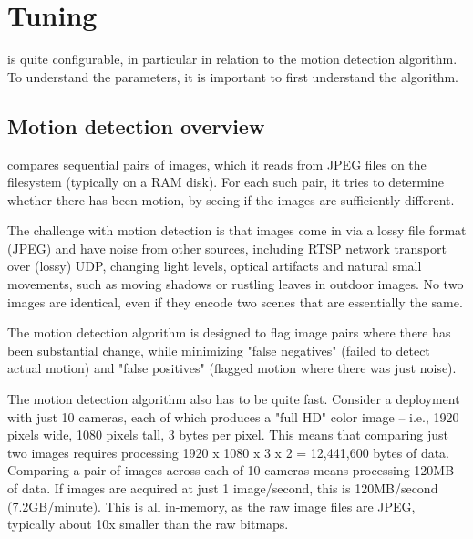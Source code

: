 \newcommand{\Variable}[4]%
  {%
  \begin{tabularx}{\linewidth}{lY}
  \emph{Parameter}
  & #1
  \\
  \emph{Built-in default}
  & #2
  \\
  \emph{Global default}
  & \texttt{#3}
  \\
  \emph{Per-camera default}
  & \texttt{#4}
  \\
  \end{tabularx}
  }

\clearpage
\section{Tuning}
\label{tuning}

  \PRODUCT{} is quite configurable, in particular in relation to the
  motion detection algorithm.  To understand the parameters, it is
  important to first understand the algorithm.

  \subsection{Motion detection overview}

    \PRODUCT{} compares sequential pairs of images, which it reads from
    JPEG files on the filesystem (typically on a RAM disk).  For each
    such pair, it tries to determine whether there has been motion, by
    seeing if the images are sufficiently different.

    The challenge with motion detection is that images come in via a lossy
    file format (JPEG) and have noise from other sources, including RTSP
    network transport over (lossy) UDP, changing light levels, optical
    artifacts and natural small movements, such as moving shadows or
    rustling leaves in outdoor images.  No two images are identical,
    even if they encode two scenes that are essentially the same.

    The motion detection algorithm is designed to flag image pairs
    where there has been substantial change, while minimizing "false
    negatives" (failed to detect actual motion) and "false positives"
    (flagged motion where there was just noise).

    The motion detection algorithm also has to be quite fast.  Consider
    a deployment with just 10 cameras, each of which produces a
    "full HD" color image -- i.e., 1920 pixels wide, 1080 pixels
    tall, 3 bytes per pixel.  This means that comparing just two
    images requires processing 1920 x 1080 x 3 x 2 = 12,441,600
    bytes of data.  Comparing a pair of images across each of 10 cameras
    means processing 120MB of data.  If images are acquired at
    just 1 image/second, this is 120MB/second (7.2GB/minute).
    This is all in-memory, as the raw image files are JPEG, typically
    about 10x smaller than the raw bitmaps.

